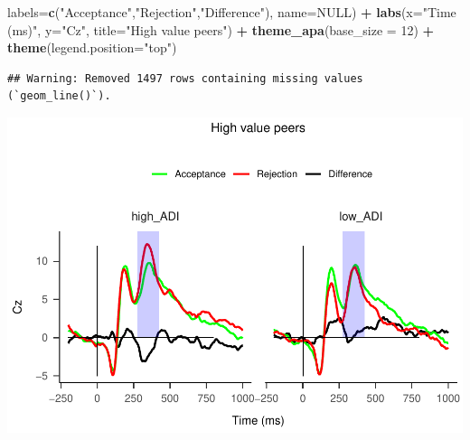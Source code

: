 \documentclass[
]{article}
\newenvironment{Shaded}{\begin{snugshade}}{\end{snugshade}}
\newcommand{\AttributeTok}[1]{\textcolor[rgb]{0.13,0.29,0.53}{#1}}
\newcommand{\ConstantTok}[1]{\textcolor[rgb]{0.56,0.35,0.01}{#1}}
\newcommand{\DecValTok}[1]{\textcolor[rgb]{0.00,0.00,0.81}{#1}}
\newcommand{\FunctionTok}[1]{\textcolor[rgb]{0.13,0.29,0.53}{\textbf{#1}}}
\newcommand{\NormalTok}[1]{#1}
\newcommand{\SpecialCharTok}[1]{\textcolor[rgb]{0.81,0.36,0.00}{\textbf{#1}}}
\newcommand{\StringTok}[1]{\textcolor[rgb]{0.31,0.60,0.02}{#1}}
\begin{document}
\begin{Shaded}
\begin{Highlighting}[]
                     \AttributeTok{labels=}\FunctionTok{c}\NormalTok{(}\StringTok{"Acceptance"}\NormalTok{,}\StringTok{"Rejection"}\NormalTok{,}\StringTok{"Difference"}\NormalTok{), }\AttributeTok{name=}\ConstantTok{NULL}\NormalTok{) }\SpecialCharTok{+}
  \FunctionTok{labs}\NormalTok{(}\AttributeTok{x=}\StringTok{"Time (ms)"}\NormalTok{, }\AttributeTok{y=}\StringTok{"Cz"}\NormalTok{, }\AttributeTok{title=}\StringTok{"High value peers"}\NormalTok{) }\SpecialCharTok{+}
  \FunctionTok{theme\_apa}\NormalTok{(}\AttributeTok{base\_size =} \DecValTok{12}\NormalTok{) }\SpecialCharTok{+} \FunctionTok{theme}\NormalTok{(}\AttributeTok{legend.position=}\StringTok{"top"}\NormalTok{)}
\end{Highlighting}
\end{Shaded}

\begin{verbatim}
## Warning: Removed 1497 rows containing missing values (`geom_line()`).
\end{verbatim}

\includegraphics{do01_BUDS_files/figure-latex/unnamed-chunk-9-2.pdf}
\end{document}
